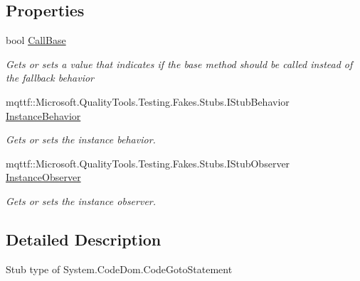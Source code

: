 \subsection*{Properties}
\begin{DoxyCompactItemize}
\item 
bool \hyperlink{class_system_1_1_code_dom_1_1_fakes_1_1_stub_code_goto_statement_a4aa9aa6d4abaa78ef6eedd9f98f4b9df}{Call\-Base}
\begin{DoxyCompactList}\small\item\em Gets or sets a value that indicates if the base method should be called instead of the fallback behavior\end{DoxyCompactList}\item 
mqttf\-::\-Microsoft.\-Quality\-Tools.\-Testing.\-Fakes.\-Stubs.\-I\-Stub\-Behavior \hyperlink{class_system_1_1_code_dom_1_1_fakes_1_1_stub_code_goto_statement_aa2145a06a0977d248e5b3370e4931a19}{Instance\-Behavior}
\begin{DoxyCompactList}\small\item\em Gets or sets the instance behavior.\end{DoxyCompactList}\item 
mqttf\-::\-Microsoft.\-Quality\-Tools.\-Testing.\-Fakes.\-Stubs.\-I\-Stub\-Observer \hyperlink{class_system_1_1_code_dom_1_1_fakes_1_1_stub_code_goto_statement_ac6e2afbc252e73e72dbbbfbd95f5b52e}{Instance\-Observer}
\begin{DoxyCompactList}\small\item\em Gets or sets the instance observer.\end{DoxyCompactList}\end{DoxyCompactItemize}


\subsection{Detailed Description}
Stub type of System.\-Code\-Dom.\-Code\-Goto\-Statement



